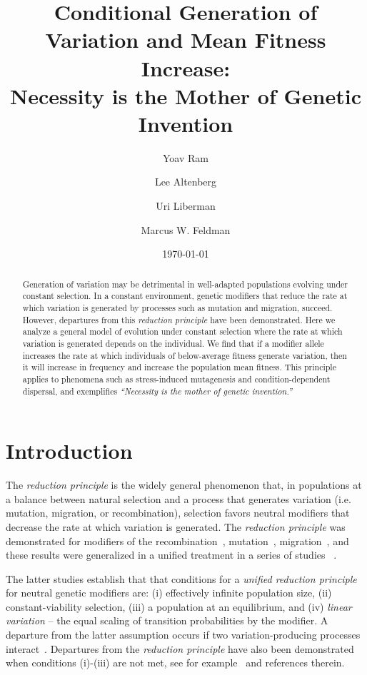 \documentclass[9pt, a4paper, twocolumn]{extarticle}
\title{Conditional Generation of Variation and Mean Fitness Increase: \\ Necessity is the Mother of Genetic Invention}
\author[a]{Yoav Ram}
\author[b]{Lee Altenberg}
\author[c]{Uri Liberman}
\author[a]{Marcus W. Feldman}
\affil[a]{Department of Biology, Stanford University, Stanford, CA}
\affil[b]{Information and Computer Sciences, University of Hawai`i at M{\=a}noa, Honolulu, HI}
\affil[c]{School of Mathematical Sciences, Tel Aviv University, Israel}
\date{\today}
\begin{document}
\maketitle

\begin{abstract}
Generation of variation may be detrimental in well-adapted populations evolving under constant selection.
In a constant environment, genetic modifiers that reduce the rate at which variation is generated by processes such as mutation and migration, succeed.
However, departures from this \emph{reduction principle} have been demonstrated.
Here we analyze a general model of evolution under constant selection where the rate at which variation is generated depends on the individual.
We find that if a modifier allele increases the rate at which individuals of below-average fitness generate variation, then it will increase in frequency and increase the  population mean fitness. This principle applies to phenomena such as stress-induced mutagenesis and condition-dependent dispersal, and exemplifies \emph{``Necessity is the mother of genetic invention.''}
\end{abstract}

\section*{Introduction}

The \emph{reduction principle} is the widely general phenomenon that, in populations at a balance between natural selection and a process that generates variation (i.e. mutation, migration, or recombination), selection favors neutral modifiers that decrease the rate at which variation is generated. 
The \emph{reduction principle} was demonstrated for modifiers of the recombination~\citep{Feldman1972}, mutation~\citep{Liberman1986a}, migration~\citep{Feldman1986}, and these results were generalized in a unified treatment in a series of studies ~\citep{Altenberg:1984:Book,Altenberg1987,Altenberg:2009:Linear,Altenberg:2012:Resolvent-Positive,Altenberg2012b,Altenberg2017}.

The latter studies establish that that conditions for a \emph{unified reduction principle} for neutral genetic modifiers are:
(i) effectively infinite population size, (ii) constant-viability selection, (iii) a population at an equilibrium, and (iv) \emph{linear variation} -- the equal scaling of transition probabilities by the modifier.
A departure from the latter assumption occurs if two variation-producing processes interact~\citep{Feldman1980,Altenberg2012b}.
Departures from the \emph{reduction principle} have also been demonstrated when conditions (i)-(iii) are not met, see for example~\citet{Holsinger1986} and references therein.
\end{document}

